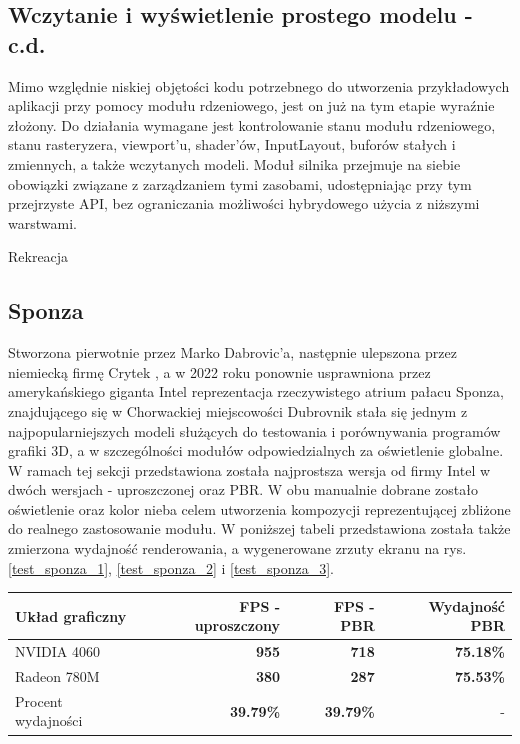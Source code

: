 \subsection{Wczytanie i wyświetlenie prostego modelu - c.d.}
Mimo względnie niskiej objętości kodu potrzebnego do utworzenia przykładowych aplikacji przy pomocy modułu rdzeniowego, jest on już na tym etapie wyraźnie złożony. Do działania wymagane jest kontrolowanie stanu modułu rdzeniowego, stanu rasteryzera, viewport'u, shader'ów, InputLayout, buforów stałych i zmiennych, a także wczytanych modeli. Moduł silnika przejmuje na siebie obowiązki związane z zarządzaniem tymi zasobami, udostępniając przy tym przejrzyste API, bez ograniczania możliwości hybrydowego użycia z niższymi warstwami. 

Rekreacja 

\subsection{Sponza}
Stworzona pierwotnie przez Marko Dabrovic'a, następnie ulepszona przez niemiecką firmę Crytek \cite{github:Khronos:Sponza}, a w 2022 roku ponownie usprawniona przez amerykańskiego giganta Intel \cite{Intel:GPUResearch:Sponza} reprezentacja rzeczywistego atrium pałacu Sponza, znajdującego się w Chorwackiej miejscowości Dubrovnik stała się jednym z najpopularniejszych modeli służących do testowania i porównywania programów grafiki 3D, a w szczególności modułów odpowiedzialnych za oświetlenie globalne. W ramach tej sekcji przedstawiona została najprostsza wersja od firmy Intel w dwóch wersjach - uproszczonej oraz PBR. W obu manualnie dobrane zostało oświetlenie oraz kolor nieba celem utworzenia kompozycji reprezentującej zbliżone do realnego zastosowanie modułu. W poniższej tabeli przedstawiona została także zmierzona wydajność renderowania, a wygenerowane zrzuty ekranu na rys. \ref{test_sponza_1}, \ref{test_sponza_2} i \ref{test_sponza_3}.

\begin{center}
	\begin{tabular}{ |l r r r|}
		\hline
		\textbf{Układ graficzny} & \textbf{FPS - uproszczony} & \textbf{FPS - PBR} & \textbf{Wydajność PBR} \\
		\hline
		NVIDIA 4060 & \textbf{955} & \textbf{718} & \textbf{75.18\%} \\
		Radeon 780M & \textbf{380} & \textbf{287} & \textbf{75.53\%} \\
		Procent wydajności & \textbf{39.79\%} & \textbf{39.79\%} & - \\
		\hline
	\end{tabular}
\end{center}

